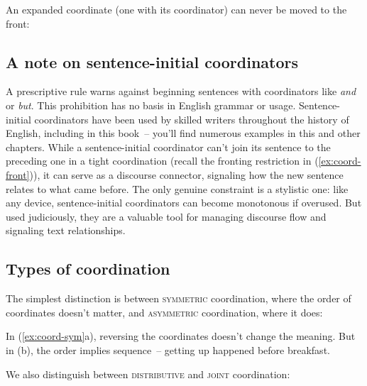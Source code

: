 \ea \label{ex:coordinate-function}
    \z
\z

An expanded coordinate (one with its coordinator) can never be moved to the front:

\ea \label{ex:coord-front}
    \z
\z

\subsection{A note on sentence-initial coordinators}

A prescriptive rule warns against beginning sentences with coordinators like \textit{and} or \textit{but}. This prohibition has no basis in English grammar or usage. Sentence-initial coordinators have been used by skilled writers throughout the history of English, including in this book~-- you'll find numerous examples in this and other chapters. While a sentence-initial coordinator can't join its sentence to the preceding one in a tight coordination (recall the fronting restriction in (\ref{ex:coord-front})), it can serve as a discourse connector, signaling how the new sentence relates to what came before. The only genuine constraint is a stylistic one: like any device, sentence-initial coordinators can become monotonous if overused. But used judiciously, they are a valuable tool for managing discourse flow and signaling text relationships.

\subsection{Types of coordination}

The simplest distinction is between \textsc{symmetric} coordination, where the order of coordinates doesn't matter, and \textsc{asymmetric} coordination, where it does:

\ea \label{ex:coord-sym}
    \z
\z

In (\ref{ex:coord-sym}a), reversing the coordinates doesn't change the meaning. But in (b), the order implies sequence~-- getting up happened before breakfast.

We also distinguish between \textsc{distributive} and \textsc{joint} coordination:

